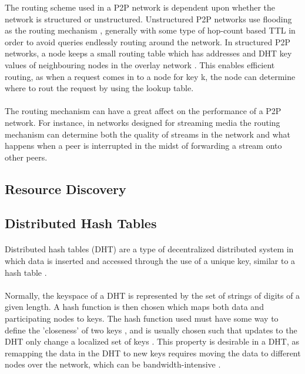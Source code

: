 \documentclass[12pt,letterpaper]{article}
\begin{document}
The routing scheme used in a P2P network is dependent upon whether the network is structured or unstructured.
Unstructured P2P networks use flooding as the routing mechanism \cite{overlay}, generally with some type of hop-count based TTL in order to avoid queries endlessly routing around the network.
In structured P2P networks, a node keeps a small routing table which has addresses and DHT key values of neighbouring nodes in the overlay network \cite{overlay}.
This enables efficient routing, as when a request comes in to a node for key k, the node can determine where to rout the request by using the lookup table.

\paragraph{}

The routing mechanism can have a great affect on the performance of a P2P network.
For instance, in networks designed for streaming media \cite{streaming} the routing mechanism can determine both the quality of streams in the network and what happens when a peer is interrupted in the midst of forwarding a stream onto other peers.

\subsection{Resource Discovery}

\subsection{Distributed Hash Tables}
\label{DHT}

\paragraph{}

Distributed hash tables (DHT) are a type of decentralized distributed system in which data is inserted and accessed through the use of a unique key, similar to a hash table \cite{dht}\cite{wiki-dht}.

\paragraph{}

Normally, the keyspace of a DHT is represented by the set of strings of digits of a given length.
A hash function is then chosen which maps both data and participating nodes to keys.
The hash function used must have some way to define the 'closeness' of two keys \cite{dht}, and is usually chosen such that updates to the DHT only change a localized set of keys \cite{wiki-dht}.
This property is desirable in a DHT, as remapping the data in the DHT to new keys requires moving the data to different nodes over the network, which can be bandwidth-intensive \cite{wiki-dht}.
\end{document}

